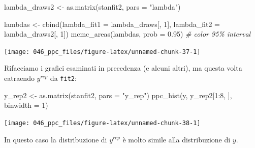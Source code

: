 \documentclass[
  10pt,
  italian,
  a4paper,
  extrafontsizes,onecolumn,openright
  ]{memoir}
\newenvironment{Shaded}{\begin{snugshade}}{\end{snugshade}}
\newcommand{\AttributeTok}[1]{\textcolor[rgb]{0.77,0.63,0.00}{#1}}
\newcommand{\CommentTok}[1]{\textcolor[rgb]{0.56,0.35,0.01}{\textit{#1}}}
\newcommand{\DecValTok}[1]{\textcolor[rgb]{0.00,0.00,0.81}{#1}}
\newcommand{\FloatTok}[1]{\textcolor[rgb]{0.00,0.00,0.81}{#1}}
\newcommand{\FunctionTok}[1]{\textcolor[rgb]{0.00,0.00,0.00}{#1}}
\newcommand{\NormalTok}[1]{#1}
\newcommand{\OtherTok}[1]{\textcolor[rgb]{0.56,0.35,0.01}{#1}}
\newcommand{\SpecialCharTok}[1]{\textcolor[rgb]{0.00,0.00,0.00}{#1}}
\newcommand{\StringTok}[1]{\textcolor[rgb]{0.31,0.60,0.02}{#1}}
\begin{document}
\begin{Shaded}
\end{Shaded}

\begin{Shaded}
\begin{Highlighting}[]
\NormalTok{lambda\_draws2 }\OtherTok{\textless{}{-}} \FunctionTok{as.matrix}\NormalTok{(stanfit2, }\AttributeTok{pars =} \StringTok{"lambda"}\NormalTok{)}

\NormalTok{lambdas }\OtherTok{\textless{}{-}} \FunctionTok{cbind}\NormalTok{(}\AttributeTok{lambda\_fit1 =}\NormalTok{ lambda\_draws[, }\DecValTok{1}\NormalTok{],}
                 \AttributeTok{lambda\_fit2 =}\NormalTok{ lambda\_draws2[, }\DecValTok{1}\NormalTok{])}
\FunctionTok{mcmc\_areas}\NormalTok{(lambdas, }\AttributeTok{prob =} \FloatTok{0.95}\NormalTok{) }\CommentTok{\# color 95\% interval}
\end{Highlighting}
\end{Shaded}

\begin{center}\texttt{[image: 046\_ppc\_files/figure-latex/unnamed-chunk-37-1]} \end{center}

Rifacciamo i grafici esaminati in precedenza (e alcuni altri), ma questa volta eatraendo \(y^{rep}\) da \texttt{fit2}:

\begin{Shaded}
\begin{Highlighting}[]
\NormalTok{y\_rep2 }\OtherTok{\textless{}{-}} \FunctionTok{as.matrix}\NormalTok{(stanfit2, }\AttributeTok{pars =} \StringTok{"y\_rep"}\NormalTok{)}
\FunctionTok{ppc\_hist}\NormalTok{(y, y\_rep2[}\DecValTok{1}\SpecialCharTok{:}\DecValTok{8}\NormalTok{, ], }\AttributeTok{binwidth =} \DecValTok{1}\NormalTok{)}
\end{Highlighting}
\end{Shaded}

\begin{center}\texttt{[image: 046\_ppc\_files/figure-latex/unnamed-chunk-38-1]} \end{center}

\noindent
In questo caso la distribuzione di \(y^{rep}\) è molto simile alla distribuzione di \(y\).
\end{document}
